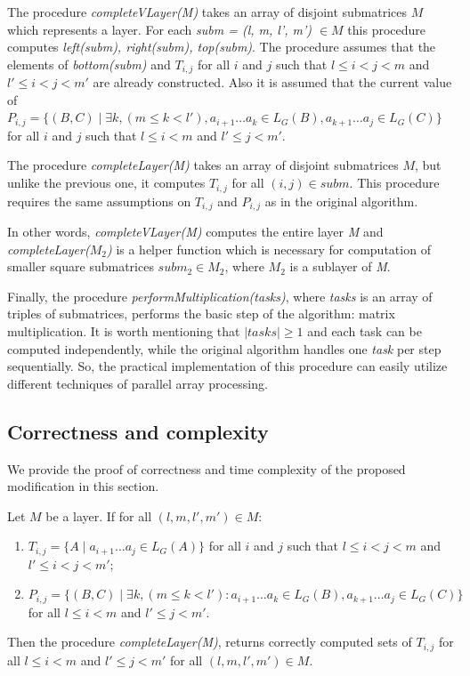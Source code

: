 The procedure \textit{completeVLayer(M)} takes an array of disjoint submatrices $M$ which represents a layer.
For each \textit{subm = (l, m, l', m') $\in M$} this procedure computes \textit{left(subm), right(subm), top(subm)}.
The procedure assumes that the elements of \textit{bottom(subm)} and $T_{i, j}$ for all $i$ and $j$ such that $l \leq i < j < m$ and $  l' \leq i < j < m'$ are already constructed.
Also it is assumed that the current value of
$P_{i, j} =  \{ (B, C) \mid \exists k, (m \le k < l'), a_{i + 1} \dots a_{k} \in L_G(B), a_{k + 1} \dots a_{j} \in L_G(C)\} $ for all $i$ and $j$ such that $l \leq i < m$ and $l' \leq j < m'$.

The procedure \textit{completeLayer(M)} takes an array of disjoint submatrices $M$, but unlike the previous one, it computes $T_{i, j}$ for all $(i, j) \in subm$.
This procedure requires the same assumptions on $T_{i, j}$  and $P_{i, j}$  as in the original algorithm.

In other words, \textit{completeVLayer(M)} computes the entire layer \textit{M} \linebreak and \textit{completeLayer($M_{2}$)} is a helper function which is necessary for computation of smaller square submatrices $subm_{2} \in M_{2}$, where $M_2$ is a sublayer of \textit{M}.

Finally, the procedure \textit{performMultiplication(tasks)}, where \textit{tasks} is an array of triples of submatrices, performs the basic step of the algorithm: matrix multiplication.
It is worth mentioning that $|tasks| \ge 1$ and each task can be computed independently, while the original algorithm handles one \textit{task} per step sequentially.
So, the practical implementation of this procedure can easily utilize different techniques of parallel array processing.

\subsection{Correctness and complexity}

We provide the proof of correctness and time complexity of the proposed modification in this section.

\begin{lemma}
Let $M$ be a layer. If for all $(l, m, l', m') \in M$:
\begin{enumerate}
  \item $T_{i, j} = \{ A \mid  a_{i + 1} \dots a_{j} \in L_G(A)\}$ for all $i$ and $j$ such that $l \leq i < j < m$ and $l' \leq i < j < m'$;
  \item $P_{i, j} =  \{ (B, C) \mid \exists k, (m \le k < l'): a_{i + 1} \dots a_{k} \in L_G(B), a_{k + 1} \dots a_{j} \in L_G(C)\}$ for all $l \leq i < m$ and $l' \leq j < m'$.
\end{enumerate}

Then the procedure \textit{completeLayer(M)}, returns correctly computed sets of $T_{i, j}$ for all $l \leq i < m$ and $l' \leq j < m'$ for all $(l, m, l', m') \in M$.
\end{lemma}

